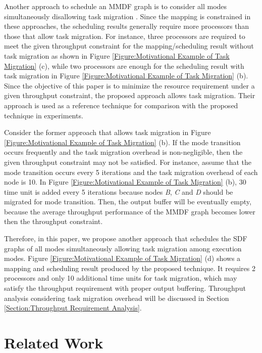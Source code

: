\documentclass[prodmode,acmtecs]{acmsmall}
\begin{document}
Another approach to schedule an MMDF graph is to consider all modes simultaneously disallowing task migration \cite{Stuijk:2008} \cite{Geilen:2010}. Since the mapping is constrained in these approaches, the scheduling results generally require more processors than those that allow task migration. For instance, three processors are required to meet the given throughput constraint for the mapping/scheduling result without task migration as shown in Figure \ref{Figure:Motivational Example of Task Migration} (c), while two processors are enough for the scheduling result with task migration in Figure \ref{Figure:Motivational Example of Task Migration} (b). Since the objective of this paper is to minimize the resource requirement under a given throughput constraint, the proposed approach allows task migration. Their approach is used as a reference technique for comparison with the proposed technique in experiments.

Consider the former approach that allows task migration in Figure \ref{Figure:Motivational Example of Task Migration} (b). If the mode transition occurs frequently and the task migration overhead is non-negligible, then the given throughput constraint may not be satisfied. For instance, assume that the mode transition occurs every 5 iterations and the task migration overhead of each node is 10. In Figure \ref{Figure:Motivational Example of Task Migration} (b), 30 time unit is added every 5 iterations because nodes \textit{B}, \textit{C} and \textit{D} should be migrated for mode transition. Then, the output buffer will be eventually empty, because the average throughput performance of the MMDF graph becomes lower then the throughput constraint.

Therefore, in this paper, we propose another approach that schedules the SDF graphs of all modes simultaneously allowing task migration among execution modes. Figure \ref{Figure:Motivational Example of Task Migration} (d) shows a mapping and scheduling result produced by the proposed technique. It requires 2 processors and only 10 additional time units for task migration, which may satisfy the throughput requirement with proper output buffering. Throughput analysis considering task migration overhead will be discussed in Section \ref{Section:Throughput Requirement Analysis}.

\section{Related Work}
\label{Section:Related Work}
\end{document}
